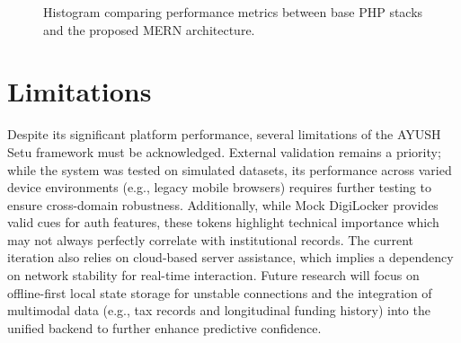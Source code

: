 \documentclass[conference]{IEEEtran}
\begin{document}
\begin{figure}[!t]
\centering
{}
\caption{Histogram comparing performance metrics between base PHP stacks and the proposed MERN architecture.}
\label{fig:model_histogram}
\end{figure}

\section{Limitations}
Despite its significant platform performance, several limitations of the AYUSH Setu framework must be acknowledged. External validation remains a priority; while the system was tested on simulated datasets, its performance across varied device environments (e.g., legacy mobile browsers) requires further testing to ensure cross-domain robustness. Additionally, while Mock DigiLocker provides valid cues for auth features, these tokens highlight technical importance which may not always perfectly correlate with institutional records. The current iteration also relies on cloud-based server assistance, which implies a dependency on network stability for real-time interaction. Future research will focus on offline-first local state storage for unstable connections and the integration of multimodal data (e.g., tax records and longitudinal funding history) into the unified backend to further enhance predictive confidence.
\end{document}
